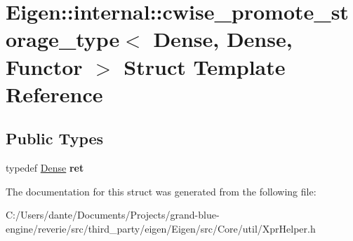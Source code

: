 \hypertarget{struct_eigen_1_1internal_1_1cwise__promote__storage__type_3_01_dense_00_01_dense_00_01_functor_01_4}{}\section{Eigen\+::internal\+::cwise\+\_\+promote\+\_\+storage\+\_\+type$<$ Dense, Dense, Functor $>$ Struct Template Reference}
\label{struct_eigen_1_1internal_1_1cwise__promote__storage__type_3_01_dense_00_01_dense_00_01_functor_01_4}
\subsection*{Public Types}
\begin{DoxyCompactItemize}
\item 
\mbox{\label{struct_eigen_1_1internal_1_1cwise__promote__storage__type_3_01_dense_00_01_dense_00_01_functor_01_4_a50e48bcebb52811d17225a868810466a}} 
typedef \mbox{\hyperlink{struct_eigen_1_1_dense}{Dense}} {\bfseries ret}
\end{DoxyCompactItemize}


The documentation for this struct was generated from the following file\+:\begin{DoxyCompactItemize}
\item 
C\+:/\+Users/dante/\+Documents/\+Projects/grand-\/blue-\/engine/reverie/src/third\+\_\+party/eigen/\+Eigen/src/\+Core/util/Xpr\+Helper.\+h\end{DoxyCompactItemize}
